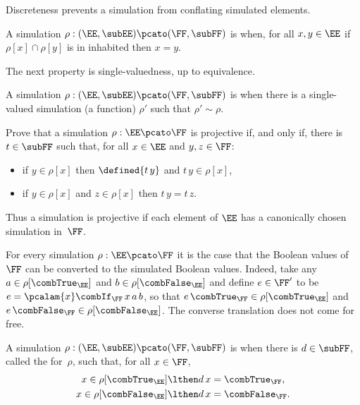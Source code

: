 Discreteness prevents a simulation from conflating simulated elements.

\begin{definition}
  A simulation $\rho: (\EE, \subEE) \pcato (\FF, \subFF)$ is
   when, for all $x, y \in \EE$ if $\rho[x] \cap \rho[y]$ is in inhabited then $x = y$.
\end{definition}

The next property is single-valuedness, up to equivalence.

\begin{definition}
  A simulation $\rho: (\EE, \subEE) \pcato (\FF, \subFF)$ is
   when there is a single-valued simulation (a function) $\rho'$ such that $\rho' \sim \rho$.
\end{definition}

\begin{exercise}
  Prove that a simulation $\rho : \EE \pcato \FF$ is projective if, and only if,
  there is $t \in \subFF$ such that, for all $x \in \EE$ and $y, z \in \FF$:
  \begin{itemize}
  \item if $y \in \rho[x]$ then $\defined{t\,y}$ and $t\,y \in \rho[x]$,
  \item if $y \in \rho[x]$ and $z \in \rho[x]$ then $t \, y = t \, z$.
  \end{itemize}
  Thus a simulation is projective if each element of $\EE$ has a canonically chosen simulation in~$\FF$.
\end{exercise}


For every simulation $\rho : \EE \pcato \FF$ it is the case that the Boolean values of~$\FF$ can be converted to the simulated Boolean values. Indeed, take any $a \in \rho[\combTrue_\EE]$ and $b \in \rho[\combFalse_\EE]$ and define $e \in \FF'$ to be
$e = \pcalam{x} \combIf_\FF \, x \, a \, b$, so that $e \, \combTrue_\FF \in \rho[\combTrue_\EE]$ and $e \, \combFalse_\FF \in \rho[\combFalse_\EE]$. The converse translation does not come for free.

\begin{definition}
  A simulation $\rho: (\EE, \subEE) \pcato (\FF, \subFF)$ is
   when there is $d \in \subFF$,
  called the
   for~$\rho$, such that, for all $x \in \FF$,
  \begin{align*}
    x \in \rho[\combTrue_\EE] &\lthen d \, x = \combTrue_\FF,
    \\
    x \in \rho[\combFalse_\EE] &\lthen d \, x = \combFalse_\FF.
  \end{align*}
\end{definition}

